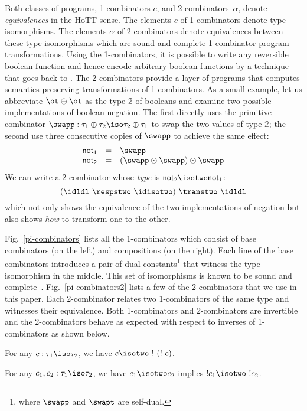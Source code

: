 \noindent Both classes of programs, 1-combinators $c$, and
2-combinators~$\alpha$, denote \emph{equivalences} in the HoTT
sense. The elements $c$ of 1-combinators denote type isomorphisms. The
elements $\alpha$ of 2-combinators denote equivalences between these
type isomorphisms which are sound and complete 1-combinator program
transformations. Using the 1-combinators, it is possible to write any
reversible boolean function and hence encode arbitrary boolean
functions by a technique that goes back to \cite{Toffoli:1980}. The
2-combinators provide a layer of programs that computes
semantics-preserving transformations of 1-combinators. As a small
example, let us abbreviate $\ot \oplus \ot$ as the type $\mathbb{2}$
of booleans and examine two possible implementations of boolean
negation. The first directly uses the primitive combinator
$\swapp : \tau_1 \oplus \tau_2 \iso \tau_2 \oplus \tau_1$ to swap the
two values of type $\mathbb{2}$; the second use three consecutive
copies of $\swapp$ to achieve the same effect:
\[\begin{array}{rcl}
\mathsf{not_1} &=& \swapp \\
\mathsf{not_2} &=& (\swapp \odot \swapp) \odot \swapp
\end{array}\]
We can write a 2-combinator whose \emph{type} is $\mathsf{not_2}
\isotwo \mathsf{not_1}$:
\[
(\idldl ~\respstwo~ \idisotwo)~\transtwo~\idldl
\]
which not only shows the equivalence of the two implementations of
negation but also shows \emph{how} to transform one to the other.

Fig.~\ref{pi-combinators} lists all the 1-combinators which consist of
base combinators (on the left) and compositions (on the right). Each
line of the base combinators introduces a pair of dual
constants\footnote{where $\swapp$ and $\swapt$ are self-dual.} that
witness the type isomorphism in the middle. This set of isomorphisms
is known to be sound and
complete~\cite{Fiore:2004,fiore-remarks}. Fig.~\ref{pi-combinators2}
lists a few of the 2-combinators that we use in this paper. Each
2-combinator relates two 1-combinators of the same type and witnesses
their equivalence. Both 1-combinators and 2-combinators are invertible
and the 2-combinators behave as expected with respect to inverses of
1-combinators as shown below.

\begin{proposition}
For any $c : \tau_1 \iso \tau_2$, we have $c \isotwo ~!~(!~c)$.
\end{proposition}

\begin{proposition}
For any $c_1,c_2 : \tau_1 \iso \tau_2$, we have $c_1 \isotwo c_2$ implies
$!c_1 \isotwo ~!c_2$.
\end{proposition}

